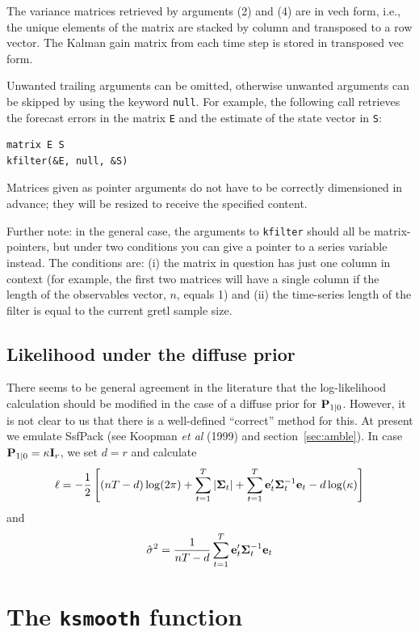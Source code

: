 \documentclass[a4paper]{article}
\newcommand{\statevar}{\ensuremath\mathbf{P}}
\newcommand{\prederr}{\ensuremath\mathbf{e}}
\newcommand{\predvar}{\ensuremath{\bm\Sigma}}
\begin{document}
The variance matrices retrieved by arguments (2) and (4) are in vech
form, i.e., the unique elements of the matrix are stacked by column
and transposed to a row vector.  The Kalman gain matrix from each time
step is stored in transposed vec form.

Unwanted trailing arguments can be omitted, otherwise unwanted
arguments can be skipped by using the keyword \texttt{null}.  For
example, the following call retrieves the forecast errors in the
matrix \texttt{E} and the estimate of the state vector in \texttt{S}:
%
\begin{verbatim}
matrix E S
kfilter(&E, null, &S)
\end{verbatim}

Matrices given as pointer arguments do not have to be correctly
dimensioned in advance; they will be resized to receive the specified
content.

Further note: in the general case, the arguments to \texttt{kfilter}
should all be matrix-pointers, but under two conditions you can give a
pointer to a series variable instead.  The conditions are: (i) the
matrix in question has just one column in context (for example, the
first two matrices will have a single column if the length of the
observables vector, $n$, equals 1) and (ii) the time-series length of
the filter is equal to the current gretl sample size.

\subsection{Likelihood under the diffuse prior}

There seems to be general agreement in the literature that the
log-likelihood calculation should be modified in the case of a diffuse
prior for $\statevar_{1|0}$.  However, it is not clear to us that
there is a well-defined ``correct'' method for this.  At present we
emulate \textsf{SsfPack} (see Koopman \textit{et al} (1999) and
section~\ref{sec:amble}).  In case $\statevar_{1|0} = \kappa
\mathbf{I}_r$, we set $d = r$ and calculate
%
\[
  \ell = -\frac{1}{2} \left[(nT-d) \log(2 \pi) + 
    \sum_{t=1}^T\left|\predvar_t\right| + 
    \sum_{t=1}^T\prederr_t'\predvar_t^{-1} \prederr_t
    - d \log(\kappa)
  \right]
\]
%
and
%
\[
\hat{\sigma}^2 = \frac{1}{nT-d} 
   \sum_{t=1}^T\prederr_t'\predvar_t^{-1} \prederr_t
\]

\section{The \texttt{ksmooth} function}
\end{document}
